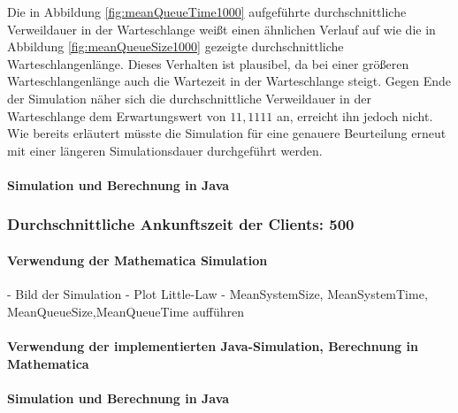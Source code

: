 Die in Abbildung \ref{fig:meanQueueTime1000} aufgeführte durchschnittliche Verweildauer in der Warteschlange weißt einen ähnlichen Verlauf auf wie die in Abbildung \ref{fig:meanQueueSize1000} gezeigte durchschnittliche Warteschlangenlänge. Dieses Verhalten ist plausibel, da bei einer größeren Warteschlangenlänge auch die Wartezeit in der Warteschlange steigt. Gegen Ende der Simulation näher sich die durchschnittliche Verweildauer in der Warteschlange dem Erwartungswert von $11,1111$ an, erreicht ihn jedoch nicht. Wie bereits erläutert müsste die Simulation für eine genauere Beurteilung erneut mit einer längeren Simulationsdauer durchgeführt werden. 

\paragraph{Simulation und Berechnung in Java}


\subsubsection{Durchschnittliche Ankunftszeit der Clients: 500}
\paragraph{Verwendung der Mathematica Simulation}
- Bild der Simulation 
- Plot Little-Law
- MeanSystemSize, MeanSystemTime, MeanQueueSize,MeanQueueTime aufführen
\paragraph{Verwendung der implementierten Java-Simulation, Berechnung in Mathematica}

%

\paragraph{Simulation und Berechnung in Java}


